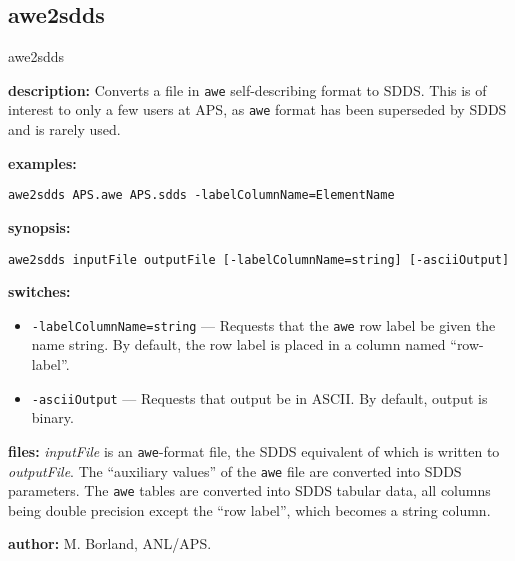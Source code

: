 \newpage
\subsection{awe2sdds}
\label{awe2sdds}

\begin{sddsprog}{awe2sdds}
  \item \textbf{description:} Converts a file in \verb|awe| self-describing format to SDDS. This is of interest to only a few users at APS, as \verb|awe| format has been superseded by SDDS and is rarely used.
  \item \textbf{examples:}
    \begin{verbatim}
awe2sdds APS.awe APS.sdds -labelColumnName=ElementName
    \end{verbatim}
  \item \textbf{synopsis:}
    \begin{verbatim}
awe2sdds inputFile outputFile [-labelColumnName=string] [-asciiOutput]
    \end{verbatim}
  \item \textbf{switches:}
    \begin{itemize}
      \item \verb|-labelColumnName=string| --- Requests that the \verb|awe| row label be given the name string. By default, the row label is placed in a column named ``row-label''.
      \item \verb|-asciiOutput| --- Requests that output be in ASCII. By default, output is binary.
    \end{itemize}
  \item \textbf{files:} \emph{inputFile} is an \verb|awe|-format file, the SDDS equivalent of which is written to \emph{outputFile}. The ``auxiliary values'' of the \verb|awe| file are converted into SDDS parameters. The \verb|awe| tables are converted into SDDS tabular data, all columns being double precision except the ``row label'', which becomes a string column.
  \item \textbf{author:} M. Borland, ANL/APS.
\end{sddsprog}

